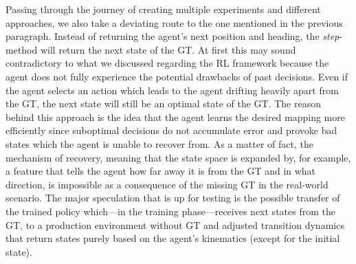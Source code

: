 Passing through the journey of creating multiple experiments and different approaches, we also take a deviating route to the one mentioned in the previous paragraph. Instead of returning the agent's next position and heading, the \textit{step}-method will return the next state of the GT. At first this may sound contradictory to what we discussed regarding the RL framework because the agent does not fully experience the potential drawbacks of past decisions. Even if the agent selects an action which leads to the agent drifting heavily apart from the GT, the next state will still be an optimal state of the GT. The reason behind this approach is the idea that the agent learns the desired mapping more efficiently since suboptimal decisions do not accumulate error and provoke bad states which the agent is unable to recover from. As a matter of fact, the mechanism of recovery, meaning that the state space is expanded by, for example, a feature that tells the agent how far away it is from the GT and in what direction, is impossible as a consequence of the missing GT in the real-world scenario. The major speculation that is up for testing is the possible transfer of the trained policy which—in the training phase—receives next states from the GT, to a production environment without GT and adjusted transition dynamics that return states purely based on the agent's kinematics (except for the initial state).